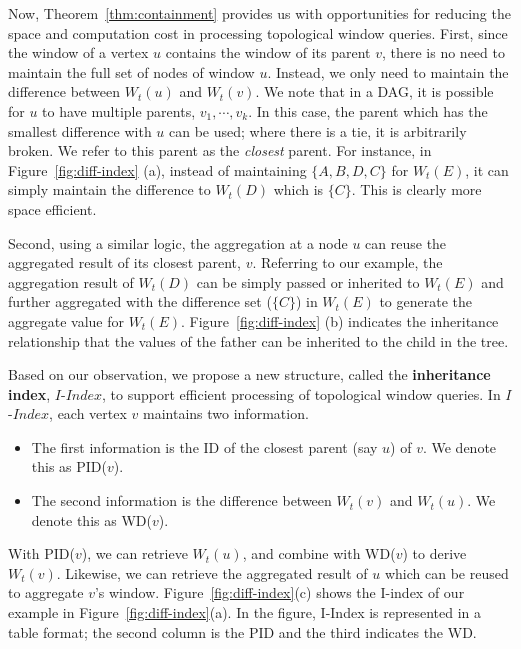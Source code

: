 Now, Theorem~\ref{thm:containment} provides us with opportunities for reducing
the space and computation cost in processing topological window queries. 
First, since the window of a vertex $u$ contains
the window of its parent $v$, there is no need to maintain
the full set of nodes of window $u$. Instead, we only
need to maintain the difference between $W_t(u)$ and $W_t(v)$.
We note that in a DAG, it is possible for $u$ to have
multiple parents, $v_1, \cdots, v_k$. In this case, the parent
which has the smallest difference with $u$ can be used; where there
is a tie, it is arbitrarily broken.
We refer to this parent as the {\em closest} parent. For instance, in Figure~\ref{fig:diff-index} (a), instead of maintaining 
$\{A, B, D, C\}$ for $W_t(E)$, it can simply maintain the difference 
to $W_t(D)$ which is $\{C\}$. This is clearly more space efficient.

Second, using a similar logic, the aggregation
at a node $u$ can reuse the 
aggregated result of its closest parent, $v$.
Referring to our example, the aggregation result of $W_t(D)$ can be 
simply passed or inherited to $W_t(E)$ and further aggregated with the difference 
set ($\{C\}$) in $W_t(E)$ to generate the aggregate value for $W_t(E)$. 
Figure~\ref{fig:diff-index} (b) indicates the inheritance relationship that 
the values of the father can be inherited to the child in the tree. 

Based on our observation, we propose a new structure, called the \textbf{inheritance index}, 
$I$-$Index$, to support efficient processing of topological window queries. 
In $I$-$Index$, each vertex $v$ maintains two information. 
\begin{itemize}
\item The first information is the ID of the closest parent (say $u$) 
of $v$. We denote this as PID($v$).
\item The second information is the difference between 
$W_t(v)$ and $W_t(u)$. We denote this as WD($v$). 
\end{itemize}

With PID($v$), we can retrieve $W_t(u)$, and combine with 
WD($v$) to derive $W_t(v)$. 
Likewise, we can retrieve the aggregated result of $u$ 
which can be reused to aggregate $v$'s window.
%
Figure~\ref{fig:diff-index}(c) shows the I-index of our example
in Figure~\ref{fig:diff-index}(a). In the figure, I-Index
is represented in a table format; 
the second column is the PID and the third indicates the WD. 

